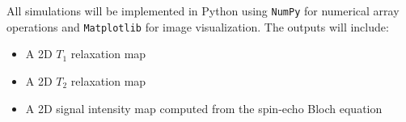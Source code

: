 \documentclass[10pt,a4paper,twoside]{article}
\begin{document}
All simulations will be implemented in Python using \texttt{NumPy} for numerical array operations and \texttt{Matplotlib} for image visualization. The outputs will include:
\begin{itemize}
    \item A 2D \(T_1\) relaxation map
    \item A 2D \(T_2\) relaxation map
    \item A 2D signal intensity map computed from the spin-echo Bloch equation
\end{itemize}








\end{document}
